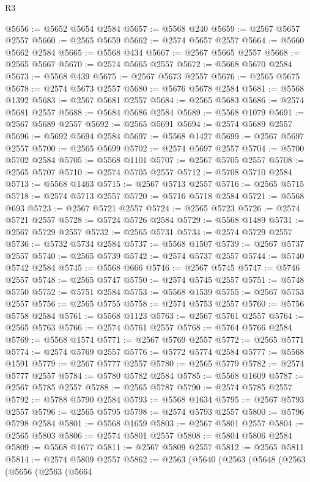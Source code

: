 \begin{lexlean}{R3}
\begin{coremodule}
@5656 := @5652 @5654 @2584
@5657 := @5568 @240
@5659 := @2567 @5657 @2557
@5660 := @2565 @5659
@5662 := @2574 @5657 @2557
@5664 := @5660 @5662 @2584
@5665 := @5568 @434
@5667 := @2567 @5665 @2557
@5668 := @2565 @5667
@5670 := @2574 @5665 @2557
@5672 := @5668 @5670 @2584
@5673 := @5568 @439
@5675 := @2567 @5673 @2557
@5676 := @2565 @5675
@5678 := @2574 @5673 @2557
@5680 := @5676 @5678 @2584
@5681 := @5568 @1392
@5683 := @2567 @5681 @2557
@5684 := @2565 @5683
@5686 := @2574 @5681 @2557
@5688 := @5684 @5686 @2584
@5689 := @5568 @1079
@5691 := @2567 @5689 @2557
@5692 := @2565 @5691
@5694 := @2574 @5689 @2557
@5696 := @5692 @5694 @2584
@5697 := @5568 @1427
@5699 := @2567 @5697 @2557
@5700 := @2565 @5699
@5702 := @2574 @5697 @2557
@5704 := @5700 @5702 @2584
@5705 := @5568 @1101
@5707 := @2567 @5705 @2557
@5708 := @2565 @5707
@5710 := @2574 @5705 @2557
@5712 := @5708 @5710 @2584
@5713 := @5568 @1463
@5715 := @2567 @5713 @2557
@5716 := @2565 @5715
@5718 := @2574 @5713 @2557
@5720 := @5716 @5718 @2584
@5721 := @5568 @693
@5723 := @2567 @5721 @2557
@5724 := @2565 @5723
@5726 := @2574 @5721 @2557
@5728 := @5724 @5726 @2584
@5729 := @5568 @1489
@5731 := @2567 @5729 @2557
@5732 := @2565 @5731
@5734 := @2574 @5729 @2557
@5736 := @5732 @5734 @2584
@5737 := @5568 @1507
@5739 := @2567 @5737 @2557
@5740 := @2565 @5739
@5742 := @2574 @5737 @2557
@5744 := @5740 @5742 @2584
@5745 := @5568 @666
@5746 := @2567 @5745
@5747 := @5746 @2557
@5748 := @2565 @5747
@5750 := @2574 @5745 @2557
@5751 := @5748 @5750
@5752 := @5751 @2584
@5753 := @5568 @1539
@5755 := @2567 @5753 @2557
@5756 := @2565 @5755
@5758 := @2574 @5753 @2557
@5760 := @5756 @5758 @2584
@5761 := @5568 @1123
@5763 := @2567 @5761 @2557
@5764 := @2565 @5763
@5766 := @2574 @5761 @2557
@5768 := @5764 @5766 @2584
@5769 := @5568 @1574
@5771 := @2567 @5769 @2557
@5772 := @2565 @5771
@5774 := @2574 @5769 @2557
@5776 := @5772 @5774 @2584
@5777 := @5568 @1591
@5779 := @2567 @5777 @2557
@5780 := @2565 @5779
@5782 := @2574 @5777 @2557
@5784 := @5780 @5782 @2584
@5785 := @5568 @1609
@5787 := @2567 @5785 @2557
@5788 := @2565 @5787
@5790 := @2574 @5785 @2557
@5792 := @5788 @5790 @2584
@5793 := @5568 @1634
@5795 := @2567 @5793 @2557
@5796 := @2565 @5795
@5798 := @2574 @5793 @2557
@5800 := @5796 @5798 @2584
@5801 := @5568 @1659
@5803 := @2567 @5801 @2557
@5804 := @2565 @5803
@5806 := @2574 @5801 @2557
@5808 := @5804 @5806 @2584
@5809 := @5568 @1677
@5811 := @2567 @5809 @2557
@5812 := @2565 @5811
@5814 := @2574 @5809 @2557
@5862 := @2563
    (@5640
      (@2563
        (@5648
          (@2563
            (@5656
              (@2563
                (@5664

\end{coremodule}
\end{lexlean}
